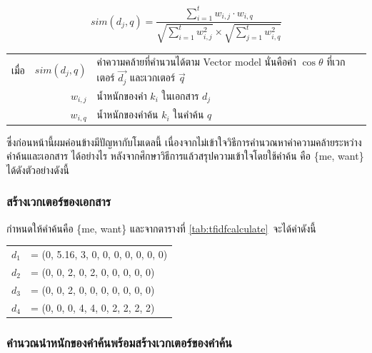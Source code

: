 \documentclass[11pt,a4paper]{article}
\begin{document}
{{{\begin{equation}
    sim(d_{j},q) = \frac{\sum_{i=1}^{t}{w_{i,j} \cdot w_{i,q}}}{\sqrt{\sum_{i=1}^{t}{w^2_{i,j}}} \times \sqrt{\sum_{j=1}^{t}{w^2_{i,q}}}}
\end{equation}

\begin{table}[ht!]
    \begin{tabular}{lrl}
        เมื่อ & $sim(d_{j}, q)$   & ค่าความคล้ายที่คำนวนได้ตาม Vector model นั่นคือค่า $\cos \theta$ ที่เวกเตอร์ $\overrightarrow{d_j}$ และเวกเตอร์ $\overrightarrow{q}$ \\
            & $w_{i,j}$         & น้ำหนักของคำ $k_i$ ในเอกสาร $d_j$ \\
            & $w_{i,q}$         & น้ำหนักของคำค้น $k_i$ ในคำค้น $q$ 
    \end{tabular}
\end{table}

ซึ่งก่อนหน้านี้ผมค่อนข้างมีปัญหากับโมเดลนี้ เนื่องจากไม่เข้าใจวิธีการคำนวณหาค่าความคล้ายระหว่างคำค้นและเอกสาร ได้อย่างไร หลังจากศึกษาวิธีการแล้วสรุปความเข้าใจโดยใช้คำค้น 
คือ \{me, want\} ได้ดังตัวอย่างดังนี้

\subsubsection{สร้างเวกเตอร์ของเอกสาร}

กำหนดให้คำค้นคือ \{me, want\} และจากตารางที่ \ref{tab:tfidfcalculate}\ จะได้ค่าดังนี้

\begin{table}[ht!]
    \centering
    \begin{tabular}{cl} 
        $d_1$   & = (0, 5.16, 3, 0, 0, 0, 0, 0, 0, 0)  \\
        $d_2$   & = (0,    0, 2, 0, 2, 0, 0, 0, 0, 0) \\
        $d_3$   & = (0,    0, 2, 0, 0, 0, 0, 0, 0, 0)  \\
        $d_4$   & = (0,    0, 0, 4, 4, 0, 2, 2, 2, 2)  \\
    \end{tabular}
    \label{tab:inputvector}
\end{table}

\subsubsection{คำนวณนำหนักของคำค้นพร้อมสร้างเวกเตอร์ของคำค้น}

}}}
\end{document}
